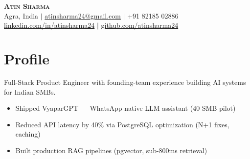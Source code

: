 \documentclass[a4paper,10pt]{article}
\newcommand{\resumeItem}[1]{
  \item\small{{#1 \vspace{-2pt}}}
}
\newcommand{\resumeItemListStart}{\begin{itemize}}
\newcommand{\resumeItemListEnd}{\end{itemize}\vspace{-5pt}}
\begin{document}
\begin{center}
    \textbf{\Huge \scshape Atin Sharma} \\ \vspace{1pt}
    \small Agra, India $|$ \href{mailto:atinsharma24@gmail.com}{atinsharma24@gmail.com} $|$ +91 82185 02886 \\
    \small \href{https://linkedin.com/in/atinsharma24}{linkedin.com/in/atinsharma24} $|$ \href{https://github.com/atinsharma24}{github.com/atinsharma24}
\end{center}

\section{Profile}
\vspace{2pt}
\small{Full-Stack Product Engineer with founding-team experience building AI systems for Indian SMBs.}
\vspace{-4pt}
\resumeItemListStart
    \resumeItem{Shipped VyaparGPT --- WhatsApp-native LLM assistant (40 SMB pilot)}
    \resumeItem{Reduced API latency by 40\% via PostgreSQL optimization (N+1 fixes, caching)}
    \resumeItem{Built production RAG pipelines (pgvector, sub-800ms retrieval)}
\resumeItemListEnd
\end{document}
